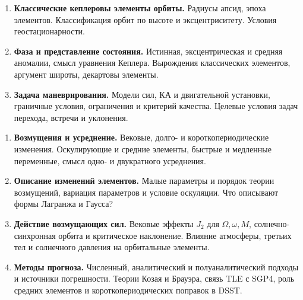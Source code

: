 \documentclass[11pt,a4paper]{article}
\begin{document}


\begin{enumerate}[series=topics]
\item \textbf{Классические кеплеровы элементы орбиты.} Радиусы апсид, эпоха
элементов. Классификация орбит по высоте и эксцентриситету. Условия геостационарности.
\item \textbf{Фаза и представление состояния.} Истинная, эксцентрическая и средняя
аномалии, смысл уравнения Кеплера. Вырождения классических элементов,
аргумент широты, декартовы элементы.
\item \textbf{Задача маневрирования.} Модели сил, КА и двигательной установки,
граничные условия, ограничения и критерий качества. Целевые условия задач
перехода, встречи и уклонения.
\end{enumerate}

\begin{enumerate}[resume=topics]
\item \textbf{Возмущения и усреднение.} Вековые, долго- и короткопериодические
изменения. Оскулирующие и средние элементы, быстрые и медленные переменные,
смысл одно- и двукратного усреднения.
\item \textbf{Описание изменений элементов.} Малые параметры и порядок теории
возмущений, вариация параметров и условие оскуляции. Что описывают формы
Лагранжа и Гаусса?
\item \textbf{Действие возмущающих сил.} Вековые эффекты $J_2$ для $\Omega,\omega,M$,
солнечно-синхронная орбита и критическое наклонение. Влияние атмосферы,
третьих тел и солнечного давления на орбитальные элементы.
\item \textbf{Методы прогноза.} Численный, аналитический и полуаналитический
подходы и источники погрешности. Теории Козая и Брауэра, связь TLE с SGP4,
роль средних элементов и короткопериодических поправок в DSST.
\end{enumerate}
\end{document}
